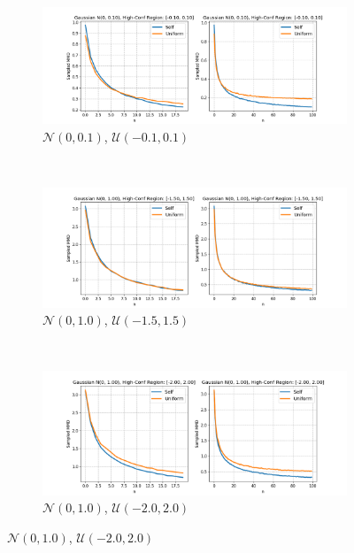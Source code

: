 \begin{figure}[h]
    \centering
    \begin{subfigure}[h]{0.49\textwidth}
        \centering
        \includegraphics[width=0.99\linewidth]{chapters/bear/images/gaussian_n0.1_k1.png}
        \caption{$\mathcal{N}(0, 0.1)$, $\mathcal{U}(-0.1, 0.1)$ }
    \end{subfigure}%
    ~ 
    \begin{subfigure}[h]{0.49\textwidth}
        \centering
        \includegraphics[width=0.99\linewidth]{chapters/bear/images/gaussian_n1_k1.5.png}
        \caption{$\mathcal{N}(0, 1.0)$, $\mathcal{U}(-1.5, 1.5)$  }
    \end{subfigure}
    ~
    \begin{subfigure}[h]{0.49\textwidth}
        \centering
        \includegraphics[width=0.99\linewidth]{chapters/bear/images/gaussian_n1_k2.png}
        \caption{$\mathcal{N}(0, 1.0)$, $\mathcal{U}(-2.0, 2.0)$  }
    \end{subfigure}

\end{figure}
